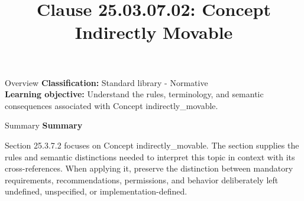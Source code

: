\documentclass[10pt,letterpaper]{article}
\title{Clause 25.03.07.02: Concept Indirectly Movable}
\author{}
\date{}
\begin{document}
\maketitle
\begin{CornellOverviewBox}{Overview}
\textbf{Classification:} Standard library - Normative\\[2pt]
\textbf{Learning objective:} Understand the rules, terminology, and semantic consequences associated with Concept indirectly\_movable.
\end{CornellOverviewBox}\begin{CornellSummaryBox}{Summary}
{\sffamily\bfseries\color{Accent} Summary}\par\vspace{3pt}Section 25.3.7.2 focuses on Concept indirectly\_movable. The section supplies the rules and semantic distinctions needed to interpret this topic in context with its cross-references. When applying it, preserve the distinction between mandatory requirements, recommendations, permissions, and behavior deliberately left undefined, unspecified, or implementation-defined.
\end{CornellSummaryBox}
\end{document}
